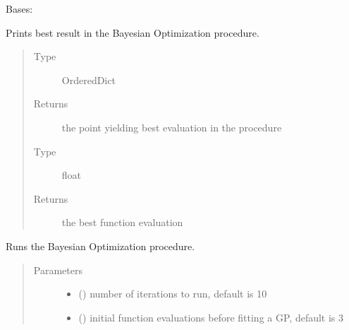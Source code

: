 \documentclass[letterpaper,10pt,english]{sphinxmanual}
\begin{document}
\begin{fulllineitems}
\label{\detokenize{index:bo.bo.BO}}
Bases: 

\begin{fulllineitems}
\label{\detokenize{index:bo.bo.BO.get_result}}
Prints best result in the Bayesian Optimization procedure.
\begin{quote}\begin{description}
\item[{Type}] \leavevmode
OrderedDict

\item[{Returns}] \leavevmode
the point yielding best evaluation in the procedure

\item[{Type}] \leavevmode
float

\item[{Returns}] \leavevmode
the best function evaluation

\end{description}\end{quote}

\end{fulllineitems}


\begin{fulllineitems}
\label{\detokenize{index:bo.bo.BO.run}}
Runs the Bayesian Optimization procedure.
\begin{quote}\begin{description}
\item[{Parameters}] \leavevmode\begin{itemize}
\item {} 
 () \textendash{} number of iterations to run, default is 10

\item {} 
 () \textendash{} initial function evaluations before fitting a GP, default is 3


\end{itemize}
\end{description}
\end{quote}
\end{fulllineitems}
\end{fulllineitems}
\end{document}
